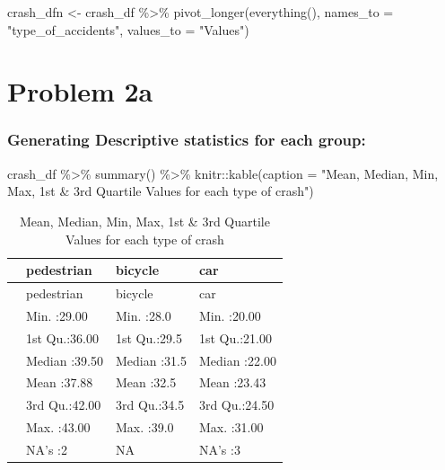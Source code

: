 \documentclass[
]{article}
\newenvironment{Shaded}{\begin{snugshade}}{\end{snugshade}}
\newcommand{\AttributeTok}[1]{\textcolor[rgb]{0.77,0.63,0.00}{#1}}
\newcommand{\FunctionTok}[1]{\textcolor[rgb]{0.00,0.00,0.00}{#1}}
\newcommand{\NormalTok}[1]{#1}
\newcommand{\OtherTok}[1]{\textcolor[rgb]{0.56,0.35,0.01}{#1}}
\newcommand{\SpecialCharTok}[1]{\textcolor[rgb]{0.00,0.00,0.00}{#1}}
\newcommand{\StringTok}[1]{\textcolor[rgb]{0.31,0.60,0.02}{#1}}
\begin{document}
\begin{Shaded}
\begin{Highlighting}[]
\NormalTok{crash\_dfn }\OtherTok{\textless{}{-}}
\NormalTok{  crash\_df }\SpecialCharTok{\%\textgreater{}\%}
  \FunctionTok{pivot\_longer}\NormalTok{(}\FunctionTok{everything}\NormalTok{(), }
               \AttributeTok{names\_to =} \StringTok{"type\_of\_accidents"}\NormalTok{,}
               \AttributeTok{values\_to =} \StringTok{"Values"}\NormalTok{)}
\end{Highlighting}
\end{Shaded}

\hypertarget{problem-2a}{%
\section{Problem 2a}\label{problem-2a}}

\hypertarget{generating-descriptive-statistics-for-each-group}{%
\subsubsection{Generating Descriptive statistics for each
group:}\label{generating-descriptive-statistics-for-each-group}}

\begin{Shaded}
\begin{Highlighting}[]
\NormalTok{crash\_df }\SpecialCharTok{\%\textgreater{}\%} 
  \FunctionTok{summary}\NormalTok{() }\SpecialCharTok{\%\textgreater{}\%} 
\NormalTok{  knitr}\SpecialCharTok{::}\FunctionTok{kable}\NormalTok{(}\AttributeTok{caption =} \StringTok{"Mean, Median, Min, Max, 1st \& 3rd Quartile Values for each type of crash"}\NormalTok{)}
\end{Highlighting}
\end{Shaded}

\begin{longtable}[]{@{}llll@{}}
\caption{Mean, Median, Min, Max, 1st \& 3rd Quartile Values for each
type of crash}\tabularnewline
\toprule
& pedestrian & bicycle & car \\
\midrule
\endfirsthead
\toprule
& pedestrian & bicycle & car \\
\midrule
\endhead
& Min. :29.00 & Min. :28.0 & Min. :20.00 \\
& 1st Qu.:36.00 & 1st Qu.:29.5 & 1st Qu.:21.00 \\
& Median :39.50 & Median :31.5 & Median :22.00 \\
& Mean :37.88 & Mean :32.5 & Mean :23.43 \\
& 3rd Qu.:42.00 & 3rd Qu.:34.5 & 3rd Qu.:24.50 \\
& Max. :43.00 & Max. :39.0 & Max. :31.00 \\
& NA's :2 & NA & NA's :3 \\
\bottomrule
\end{longtable}
\end{document}
